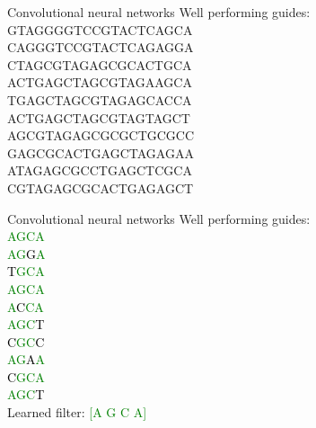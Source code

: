 \documentclass[Nike]{tuberlinbeamer}
\begin{document}
\begin{frame}{Convolutional neural networks}
  Well performing guides: \\
  {\large
    GTAGGGGTCCGTACTCAGCA \\
    CAGGGTCCGTACTCAGAGGA \\
    CTAGCGTAGAGCGCACTGCA \\
    ACTGAGCTAGCGTAGAAGCA \\
    TGAGCTAGCGTAGAGCACCA \\
    ACTGAGCTAGCGTAGTAGCT \\
    AGCGTAGAGCGCGCTGCGCC \\
    GAGCGCACTGAGCTAGAGAA \\
    ATAGAGCGCCTGAGCTCGCA \\
    CGTAGAGCGCACTGAGAGCT \\
  }
\end{frame}

\begin{frame}{Convolutional neural networks}
  Well performing guides: \\
  \textcolor{green}{\large
    AGCA \\
    AG{\textcolor{black}G}A \\
    {\textcolor{black}T}GCA \\
    AGCA \\
    A{\textcolor{black}C}CA \\
    AGC{\textcolor{black}T} \\
    {\textcolor{black}C}GC{\textcolor{black}C} \\
    AG{\textcolor{black}A}A \\
    {\textcolor{black}C}GCA \\
    AGC{\textcolor{black}T} \\
  }
  \pause
  Learned filter: \textcolor{green}{[A G C A]}
\end{frame}
\end{document}

